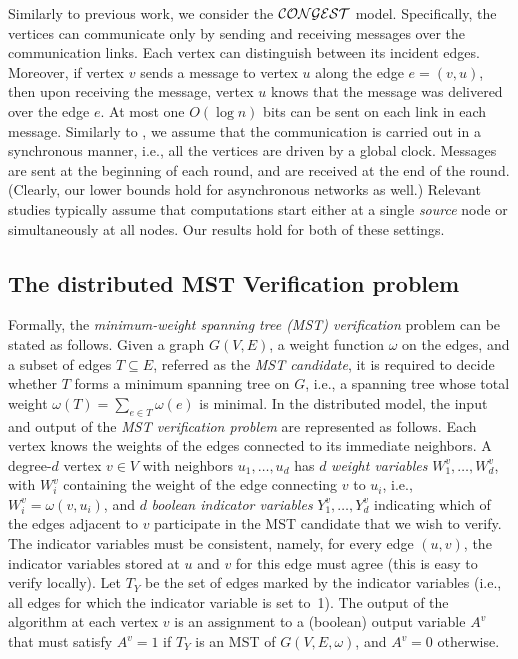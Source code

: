 \documentclass[11pt,letter]{article}
\begin{document}
Similarly to previous work, we consider the $\cal{CONGEST}$ model. 
Specifically, the vertices can communicate only by sending and receiving
messages over the communication links. 
Each vertex can distinguish between its incident edges. Moreover, 
if vertex $v$ sends a message to vertex $u$ along the edge $e=(v,u)$,
then upon receiving the message, vertex $u$ knows that the message 
was delivered over the edge $e$. At most one $O(\log n)$ bits can be sent 
on each link in each message. 
Similarly to  \cite{GKP98,KP_98}, we assume that the communication 
is carried out in a synchronous manner,
i.e., all the vertices are driven by a global clock.
Messages are sent at the beginning of each round, and are received at
the end of the round.
(Clearly, our lower bounds hold for asynchronous networks as well.)
Relevant studies typically assume that computations start 
either at a single {\em source} node or simultaneously at all nodes.
Our results hold for both of these settings.

\subsection{The distributed MST Verification problem}

Formally, the {\em minimum-weight spanning tree (MST) verification} problem can be 
stated as follows. Given a graph $G(V,E)$, a weight function $\omega$ 
on the edges, and a subset of edges $T\subseteq E$, referred as the 
{\em MST candidate},  it is required to decide whether  $T$ forms a minimum  
spanning tree on $G$, i.e., a spanning tree  whose total weight 
$\omega(T)= \sum_{e\in T} \omega(e)$ is minimal.
In the distributed model, the input and output of the 
{\em MST verification problem} are represented as follows.
Each vertex knows the weights of the edges connected to its 
immediate neighbors. A degree-$d$ vertex $v \in V$ with
neighbors $u_1,\dots, u_d$ has $d$ {\em weight variables}
$W_1^v, \dots, W_d^v$, with $W_i^v$ containing the weight of the edge
connecting $v$ to $u_i$, i.e., $W_i^v = \omega(v, u_i)$, and $d$ 
{\em boolean indicator variables}  $Y_1^v, \dots, Y_d^v$ indicating which 
of the edges adjacent to $v$  participate in the MST candidate that we wish 
to verify. The indicator variables must be consistent, namely, 
for every edge $(u,v)$, the indicator variables stored at $u$ and $v$ 
for this edge must agree (this is easy to verify locally). 
Let $T_Y$ be the set of edges marked by the indicator variables 
(i.e., all edges for which the indicator variable is set to~1).
The output of the algorithm at each vertex $v$ 
is an assignment to a (boolean) output variable $A^v$ that must satisfy $A^v=1$
if $T_Y$ is an MST of $G(V,E,\omega)$, and $A^v=0$ otherwise.
\end{document}
